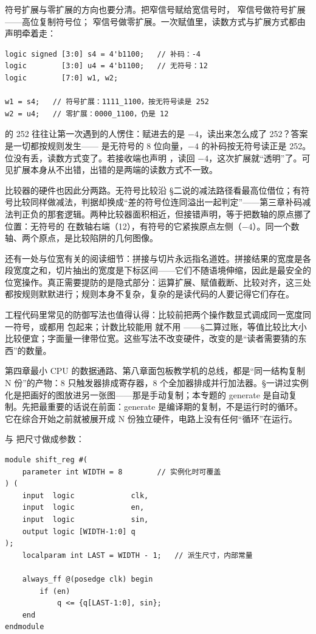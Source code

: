 符号扩展与零扩展的方向也要分清。把窄信号赋给宽信号时， 窄信号做符号扩展——高位复制符号位； 窄信号做零扩展。一次赋值里，读数方式与扩展方式都由声明牵着走：

\begin{lstlisting}
logic signed [3:0] s4 = 4'b1100;   // 补码：-4
logic        [3:0] u4 = 4'b1100;   // 无符号：12
logic        [7:0] w1, w2;

w1 = s4;   // 符号扩展：1111_1100，按无符号读是 252
w2 = u4;   // 零扩展：0000_1100，仍是 12
\end{lstlisting}

 的 252 往往让第一次遇到的人愣住：赋进去的是 $-4$，读出来怎么成了 252？答案是一切都按规则发生—— 是无符号的 8 位向量，$-4$ 的补码按无符号读正是 252。位没有丢，读数方式变了。若接收端也声明 ，读回 $-4$，这次扩展就“透明”了。可见扩展本身从不出错，出错的是两端的读数方式不一致。

比较器的硬件也因此分两路。无符号比较沿 §二说的减法路径看最高位借位；有符号比较同样做减法，判据却换成“差的符号位连同溢出一起判定”——第三章补码减法判正负的那套逻辑。两种比较器面积相近，但接错声明，等于把数轴的原点挪了位置：无符号的  在数轴右端（12），有符号的它紧挨原点左侧（$-4$）。同一个数轴、两个原点，是比较陷阱的几何图像。

还有一处与位宽有关的阅读细节：拼接与切片永远指名道姓。拼接结果的宽度是各段宽度之和，切片抽出的宽度是下标区间——它们不随语境伸缩，因此是最安全的位宽操作。真正需要提防的是隐式部分：运算扩展、赋值截断、比较对齐，这三处都按规则默默进行；规则本身不复杂，复杂的是读代码的人要记得它们存在。

工程代码里常见的防御写法也值得认得：比较前把两个操作数显式调成同一宽度同一符号，或都用  包起来；计数比较能用 \code{==} 就不用 \code{>=}——§二算过账，等值比较比大小比较便宜；字面量一律带位宽。这些写法不改变硬件，改变的是“读者需要猜的东西”的数量。


第四章最小 CPU 的数据通路、第八章面包板教学机的总线，都是“同一结构复制 N 份”的产物：8 只触发器排成寄存器，8 个全加器排成并行加法器。§一讲过实例化是把画好的图放进另一张图——那是手动复制；本专题的 generate 是自动复制。先把最重要的话说在前面：generate 是编译期的复制，不是运行时的循环。它在综合开始之前就被展开成 N 份独立硬件，电路上没有任何“循环”在运行。

 与  把尺寸做成参数：

\begin{lstlisting}
module shift_reg #(
    parameter int WIDTH = 8        // 实例化时可覆盖
) (
    input  logic             clk,
    input  logic             en,
    input  logic             sin,
    output logic [WIDTH-1:0] q
);
    localparam int LAST = WIDTH - 1;   // 派生尺寸，内部常量

    always_ff @(posedge clk) begin
        if (en)
            q <= {q[LAST-1:0], sin};
    end
endmodule
\end{lstlisting}


